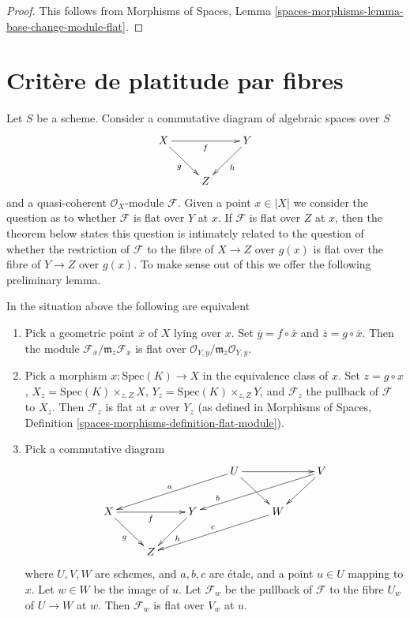 \begin{proof}
This follows from
Morphisms of Spaces, Lemma
\ref{spaces-morphisms-lemma-base-change-module-flat}.
\end{proof}












\section{Crit\`ere de platitude par fibres}
\label{section-criterion-flat-fibres}

\noindent
Let $S$ be a scheme. Consider a commutative diagram of algebraic spaces
over $S$
$$
\xymatrix{
X \ar[rr]_f \ar[dr]_g & & Y \ar[dl]^h \\
& Z
}
$$
and a quasi-coherent $\mathcal{O}_X$-module $\mathcal{F}$.
Given a point $x \in |X|$ we consider the question as to whether
$\mathcal{F}$ is flat over $Y$ at $x$. If $\mathcal{F}$ is flat
over $Z$ at $x$, then the theorem below states this question is
intimately related to the question of whether the restriction of
$\mathcal{F}$ to the fibre of $X \to Z$ over $g(x)$
is flat over the fibre of $Y \to Z$ over $g(x)$. To make sense
out of this we offer the following preliminary lemma.

\begin{lemma}
\label{lemma-flat-on-fibres-at-point}
In the situation above the following are equivalent
\begin{enumerate}
\item Pick a geometric point $\overline{x}$ of $X$ lying over $x$.
Set $\overline{y} = f \circ \overline{x}$ and
$\overline{z} = g \circ \overline{x}$. Then the module
$\mathcal{F}_{\overline{x}}/
\mathfrak m_{\overline{z}}\mathcal{F}_{\overline{x}}$
is flat over
$\mathcal{O}_{Y, \overline{y}}/
\mathfrak m_{\overline{z}}\mathcal{O}_{Y, \overline{y}}$.
\item Pick a morphism $x : \text{Spec}(K) \to X$ in the equivalence class of
$x$. Set $z = g \circ x$, $X_z = \text{Spec}(K) \times_{z, Z} X$,
$Y_z = \text{Spec}(K) \times_{z, Z} Y$, and $\mathcal{F}_z$ the pullback
of $\mathcal{F}$ to $X_z$. Then $\mathcal{F}_z$ is flat at $x$ over
$Y_z$ (as defined in Morphisms of Spaces,
Definition \ref{spaces-morphisms-definition-flat-module}).
\item Pick a commutative diagram
$$
\xymatrix{
& & & U \ar[llld]_a \ar[rr] \ar[dr] & & V \ar[llld]_>>>>>>>b \ar[dl] \\
X \ar[rr]_f \ar[dr]_g & & Y \ar[dl]^h &  & W \ar[llld]_c \\
& Z
}
$$
where $U, V, W$ are schemes, and $a, b, c$ are \'etale,
and a point $u \in U$ mapping to $x$. Let $w \in W$ be the image of
$u$. Let $\mathcal{F}_w$ be the pullback of $\mathcal{F}$ to
the fibre $U_w$ of $U \to W$ at $w$. Then $\mathcal{F}_w$
is flat over $V_w$ at $u$.
\end{enumerate}
\end{lemma}

